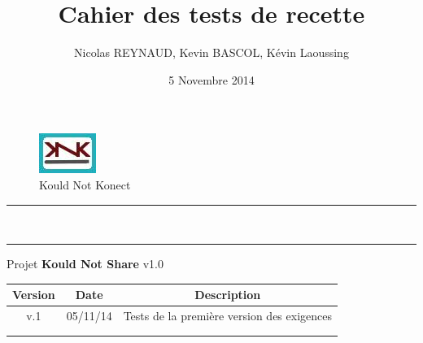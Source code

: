 \documentclass[10pt,a4paper,landscape]{report}
\author{Nicolas REYNAUD, Kevin BASCOL, Kévin Laoussing}
\title{Cahier des tests de recette}
\date{5 Novembre 2014}
\begin{document}
\makeatletter
	\begin{titlepage}
	
	\begin{figure}
		\begin{minipage}[c]{.46\linewidth}
		\end{minipage} \hfill
		\begin{minipage}[c]{.20\linewidth}
			\begin{center}
				\includegraphics{../Logo/logoKNK.jpg}\\
				{\large Kould Not Konect}
			\end{center}
		\end{minipage}
	\vspace{1cm}
	\end{figure}
	
	\centering
		{
		\hrule height 2pt
		\vspace{0.7cm}
		\Huge \textbf{\@title}}\\
		\vspace{0.7cm}
		\hrule height 2pt
		\vspace{1.5cm}
		{\LARGE  Projet \textbf{Kould Not Share} v1.0}
		
		\vfill
		
		\begin{tabular}{|c|c|c|}
			\hline
			Version & Date & Description\\
			\hline
			v.1 & 05/11/14 & Tests de la première version des exigences\\
			\hline
			 & &\\
			\hline
			 & &\\
			\hline
		\end{tabular}\\
		\vspace{1cm}
		\@author\\
		\end{titlepage}
\makeatother
\setcounter{secnumdepth}{5}
\setcounter{tocdepth}{5}
\renewcommand{\contentsname}{Sommaire}
\begingroup\makeatletter
\def\@makeschapterhead#1{%
  {\parindent \z@ \raggedright
    \normalfont
    \interlinepenalty\@M
    \Huge \bfseries  #1\par\nobreak
    \vskip 20pt%
  }}\makeatother
\tableofcontents
\endgroup
\thispagestyle{empty}
\setcounter{page}{0}
\newpage
\end{document}
